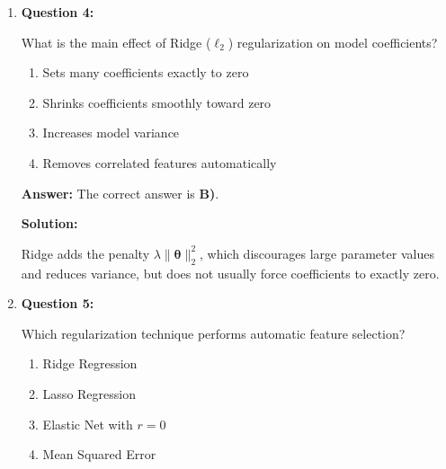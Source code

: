 \documentclass{article}
\newcommand{\vecb}[1]{\boldsymbol{#1}} %
\newcommand{\vb}[1]{\mathbf{#1}}       %
\begin{document}
\begin{enumerate}
Which optimization method can be used when gradients are unavailable?

\begin{enumerate}
    \item Newton’s Method
    \item Gradient Descent
    \item Coordinate Search
    \item Ridge Regression
\end{enumerate}

\textbf{Answer:} The correct answer is \textbf{C)}.

\textbf{Solution:}

Coordinate Search is a derivative-free method.  
It explores directions $\vecb{\theta} \pm \alpha \vb{e}_j$ and accepts moves that reduce the loss.

\vspace{6pt}

\item \textbf{Question 4:}

What is the main effect of Ridge ($\ell_2$) regularization on model coefficients?

\begin{enumerate}
    \item Sets many coefficients exactly to zero
    \item Shrinks coefficients smoothly toward zero
    \item Increases model variance
    \item Removes correlated features automatically
\end{enumerate}

\textbf{Answer:} The correct answer is \textbf{B)}.

\textbf{Solution:}

Ridge adds the penalty $\lambda\|\vecb{\theta}\|_2^2$, which discourages large parameter values and reduces variance, but does not usually force coefficients to exactly zero.

\vspace{6pt}

\item \textbf{Question 5:}

Which regularization technique performs automatic feature selection?

\begin{enumerate}
    \item Ridge Regression
    \item Lasso Regression
    \item Elastic Net with $r=0$
    \item Mean Squared Error
\end{enumerate}


\end{enumerate}
\end{document}
